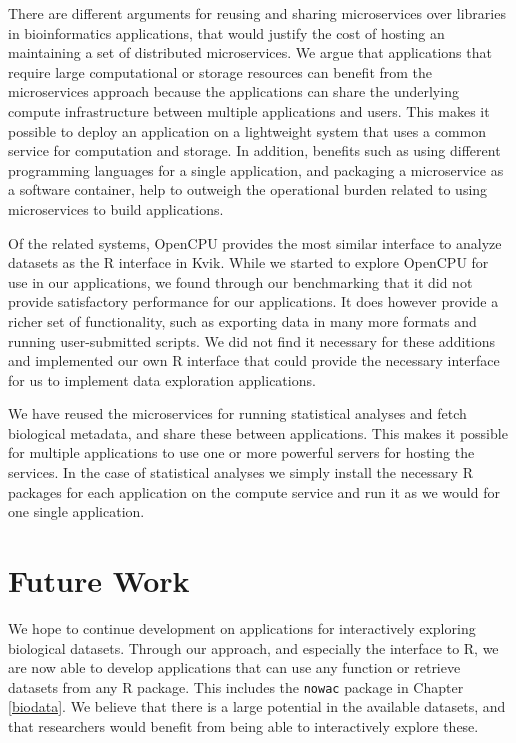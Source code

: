 There are different arguments for reusing and sharing microservices over
libraries in bioinformatics applications, that would justify the cost of hosting
an maintaining a set of distributed microservices.  We argue that applications
that require large computational or storage resources can benefit from the
microservices approach because the applications can share the underlying compute
infrastructure between multiple applications and users.  This makes it possible
to deploy an application on a lightweight system that uses a common service for
computation and storage. In addition, benefits such as using different
programming languages for a single application, and packaging a microservice as
a software container, help to outweigh the operational burden related to using
microservices to build applications. 

Of the related systems, OpenCPU provides the most similar interface to analyze
datasets as the R interface in Kvik. While we started to explore OpenCPU for use
in our applications, we found through our benchmarking that it did not provide
satisfactory performance for our applications. It does however provide a richer
set of functionality, such as exporting data in many more formats and running
user-submitted scripts. We did not find it necessary for these additions and
implemented our own R interface that could provide the necessary interface for
us to implement data exploration applications. 

We have reused the microservices for running statistical analyses and
fetch biological metadata, and share these between applications. This makes it
possible for multiple applications to use one or more powerful servers for
hosting the services. In the case of statistical analyses we simply install the
necessary R packages for each application on the compute service and run it as
we would for one single application. 

\section{Future Work} 
We hope to continue development on applications for interactively exploring
biological datasets. Through our approach, and especially the interface to R, 
we are now able to develop applications that can use any function or retrieve
datasets from any R package. This includes the \texttt{nowac} package in
Chapter \ref{biodata}. We believe that there is a large potential in the
available datasets, and that researchers would benefit from being able to
interactively explore these. 

